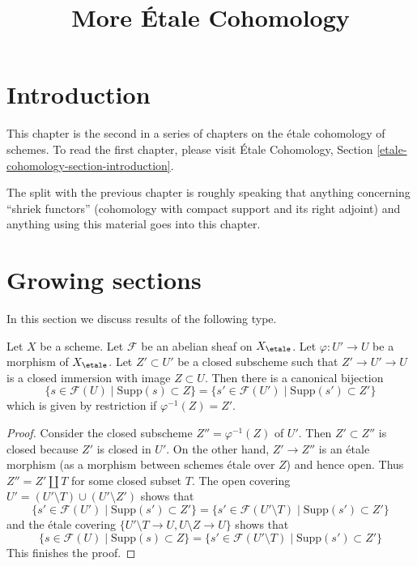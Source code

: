 

%


\title{More \'Etale Cohomology}


\maketitle

\label{section-phantom}

\tableofcontents


\section{Introduction}
\label{section-introduction}

\noindent
This chapter is the second in a series of chapters on the \'etale cohomology
of schemes. To read the first chapter, please visit
\'Etale Cohomology, Section \ref{etale-cohomology-section-introduction}.

\medskip\noindent
The split with the previous chapter is roughly speaking that anything
concerning ``shriek functors'' (cohomology with compact support and
its right adjoint) and anything using this material goes into this chapter.






\section{Growing sections}
\label{section-growing}

\noindent
In this section we discuss results of the following type.

\begin{lemma}
\label{lemma-section-support-in-locally-closed-pre}
Let $X$ be a scheme. Let $\mathcal{F}$ be an abelian sheaf on $X_\etale$.
Let $\varphi : U' \to U$ be a morphism of $X_\etale$. Let $Z' \subset U'$ be a
closed subscheme such that $Z' \to U' \to U$ is a closed immersion
with image $Z \subset U$. Then there is a canonical bijection
$$
\{s \in \mathcal{F}(U) \mid \text{Supp}(s) \subset Z\} =
\{s' \in \mathcal{F}(U') \mid \text{Supp}(s') \subset Z'\}
$$
which is given by restriction if $\varphi^{-1}(Z) = Z'$.
\end{lemma}

\begin{proof}
Consider the closed subscheme $Z'' = \varphi^{-1}(Z)$ of $U'$.
Then $Z' \subset Z''$ is closed because $Z'$ is closed in $U'$.
On the other hand, $Z' \to Z''$ is an \'etale morphism
(as a morphism between schemes \'etale over $Z$) and hence
open. Thus $Z'' = Z' \amalg T$ for some closed subset $T$.
The open covering $U' = (U' \setminus T) \cup (U' \setminus Z')$
shows that
$$
\{s' \in \mathcal{F}(U') \mid \text{Supp}(s') \subset Z'\} =
\{s' \in \mathcal{F}(U' \setminus T) \mid \text{Supp}(s') \subset Z'\}
$$
and the \'etale covering $\{U' \setminus T \to U, U \setminus Z \to U\}$
shows that
$$
\{s \in \mathcal{F}(U) \mid \text{Supp}(s) \subset Z\} =
\{s' \in \mathcal{F}(U' \setminus T) \mid \text{Supp}(s') \subset Z'\}
$$
This finishes the proof.
\end{proof}

